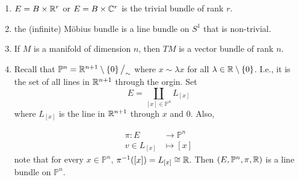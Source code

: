 \documentclass[main.tex]{subfiles}
\begin{document}
\begin{exmp}
\begin{enumerate}
    \item $E = B \times \mathbb{R}^r$ or $E = B \times \mathbb{C}^r$ is the trivial bundle of rank $r$.
    \item the (infinite) Möbius bundle is a line bundle on $S^1$ that is non-trivial.
    \item If $M$ is a manifold of dimension $n$, then $TM$ is a vector bundle of rank $n$.
    \item {} Recall that $\mathbb{P}^n = \mathbb{R}^{n+1} \setminus \left\{0\right\} \big/_\sim$ where $x \sim \lambda x$ for all $\lambda \in \mathbb{R}\setminus \left\{0\right\}$. I.e., it is the set of all lines in $\mathbb{R}^{n+1}$ through the orgin. Set 
    \[
    E = \coprod_{[x] \in \mathbb{P}^n} L_{[x]}
    \]
    where $L_[x]$ is the line in $\mathbb{R}^{n+1}$ through $x$ and $0$. Also,
    
    \begin{align*}
        \pi: E &\to \mathbb{P}^n \\
             v \in L_{[x]} &\mapsto [x]
    \end{align*}
    note that for every $x \in \mathbb{P}^n$, $\pi^{-1}([x])= L_{[x]} \cong \mathbb{R}.$ Then $(E, \mathbb{P}^n, \pi, \mathbb{R})$ is a line bundle on $\mathbb{P}^n$.
\end{enumerate}
\end{exmp}
\end{document}
